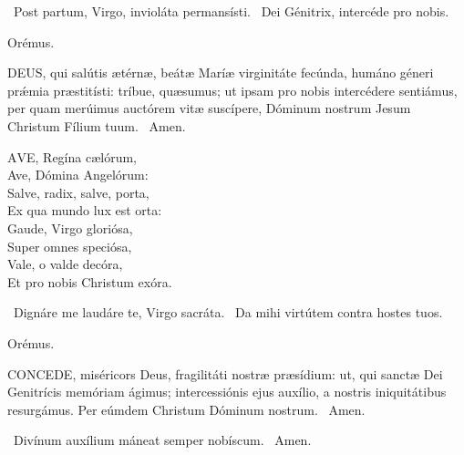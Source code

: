 
\V\ Post partum, Virgo, invioláta permansísti. \R\ Dei Génitrix, intercéde pro nobis.

Orémus. 

\lettrine[lines=2]{D}{EUS}, qui salútis ætérnæ, beátæ Maríæ virginitáte fecúnda, humáno géneri prǽmia præstitísti: tríbue, quæsumus; ut ipsam pro nobis intercédere sentiámus, per quam merúimus auctórem vitæ suscípere, Dóminum nostrum Jesum Christum Fílium tuum. \R\ Amen.



\lettrine[lines=2]{A}{VE}, Regína cælórum,\\
Ave, Dómina Angelórum:\\
Salve, radix, salve, porta,\\
Ex qua mundo lux est orta:\\
Gaude, Virgo gloriósa,\\
Super omnes speciósa,\\
Vale, o valde decóra,\\
Et pro nobis Christum exóra.

\V\ Dignáre me laudáre te, Virgo sacráta. \R\ Da mihi virtútem contra hostes tuos.

Orémus. 

\lettrine[lines=2]{C}{ONCEDE}, miséricors Deus, fragilitáti nostræ præsídium: ut, qui sanctæ Dei Genitrícis memóriam ágimus; intercessiónis ejus auxílio, a nostris iniquitátibus resurgámus. Per eúmdem Christum Dóminum nostrum. \R\ Amen.


\V\ Divínum auxílium máneat semper nobíscum. \R\ Amen.

\sectionornament



